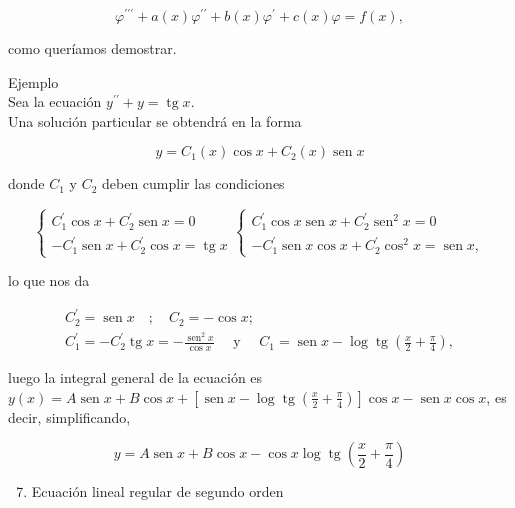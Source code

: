 \documentclass[10pt]{article}
\theoremstyle{plain}
\theoremstyle{definition}
\theoremstyle{remark}
\begin{document}
$$
\varphi^{\prime \prime \prime}+a(x) \varphi^{\prime \prime}+b(x) \varphi^{\prime}+c(x) \varphi=f(x),
$$

como queríamos demostrar.

Ejemplo\\
Sea la ecuación $y^{\prime \prime}+y=\operatorname{tg} x$.\\
Una solución particular se obtendrá en la forma

$$
y=C_{1}(x) \cos x+C_{2}(x) \operatorname{sen} x
$$

donde $C_{1}$ y $C_{2}$ deben cumplir las condiciones

$$
\left\{\begin{array} { c } 
{ C _ { 1 } ^ { \prime } \operatorname { c o s } x + C _ { 2 } ^ { \prime } \operatorname { s e n } x = 0 } \\
{ - C _ { 1 } ^ { \prime } \operatorname { s e n } x + C _ { 2 } ^ { \prime } \operatorname { c o s } x = \operatorname { t g } x }
\end{array} \left\{\begin{array}{c}
C_{1}^{\prime} \cos x \operatorname{sen} x+C_{2}^{\prime} \operatorname{sen}^{2} x=0 \\
-C_{1}^{\prime} \operatorname{sen} x \cos x+C_{2}^{\prime} \cos ^{2} x=\operatorname{sen} x,
\end{array}\right.\right.
$$

lo que nos da

$$
\begin{gathered}
C_{2}^{\prime}=\operatorname{sen} x \quad ; \quad C_{2}=-\cos x ; \\
C_{1}^{\prime}=-C_{2}^{\prime} \operatorname{tg} x=-\frac{\operatorname{sen}^{2} x}{\cos x} \quad \text { y } \quad C_{1}=\operatorname{sen} x-\log \operatorname{tg}\left(\frac{x}{2}+\frac{\pi}{4}\right),
\end{gathered}
$$

luego la integral general de la ecuación es\\
$y(x)=A \operatorname{sen} x+B \cos x+\left[\operatorname{sen} x-\log \operatorname{tg}\left(\frac{x}{2}+\frac{\pi}{4}\right)\right] \cos x-\operatorname{sen} x \cos x$, es decir, simplificando,

$$
y=A \operatorname{sen} x+B \cos x-\cos x \log \operatorname{tg}\left(\frac{x}{2}+\frac{\pi}{4}\right)
$$

\begin{enumerate}
  \setcounter{enumi}{6}
  \item Ecuación lineal regular de segundo orden
\end{enumerate}
\end{document}
